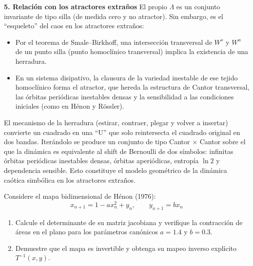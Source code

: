 \documentclass[11pt,a4paper]{article}
\newenvironment{solucion}[1][Solución Detallada]{%
    \vspace{1.5mm}%
    \noindent{\large\textbf{Solución:}}\par\vspace{1.5mm}%
}{%
    \par\vspace{3mm}%
}
\newenvironment{conclusion}[1][Interpretación Dinámica y Conclusión]{%
    \vspace{2mm}%
    \noindent{\large\textbf{Conclusión:}}\par\vspace{1.5mm}%
}{%
    \par\vspace{3mm}%
}
\begin{document}
\begin{solucion}
\textbf{\large 5. Relación con los atractores extraños}
El propio $\Lambda$ es un conjunto invariante de tipo silla (de medida cero y no atractor). Sin embargo, es el ``esqueleto'' del caos en los atractores extraños:
\begin{itemize}[leftmargin=2em]
    \item Por el teorema de Smale--Birkhoff, una intersección transversal de $W^s$ y $W^u$ de un punto silla (punto homoclínico transversal) implica la existencia de una herradura.
    \item En un sistema disipativo, la clausura de la variedad inestable de ese tejido homoclínico forma el atractor, que hereda la estructura de Cantor transversal, las órbitas periódicas inestables densas y la sensibilidad a las condiciones iniciales (como en Hénon y Rössler).
\end{itemize}

\end{solucion}

\begin{conclusion}
El mecanismo de la herradura (estirar, contraer, plegar y volver a insertar) convierte un cuadrado en una ``U'' que solo reintersecta el cuadrado original en dos bandas. Iterándolo se produce un conjunto de tipo Cantor $\times$ Cantor sobre el que la dinámica es equivalente al shift de Bernoulli de dos símbolos: infinitas órbitas periódicas inestables densas, órbitas aperiódicas, entropía $\ln 2$ y dependencia sensible. Esto constituye el modelo geométrico de la dinámica caótica simbólica en los atractores extraños.
\end{conclusion}

\vspace{3mm}

\begin{problema}[Problema 5.3]
Considere el mapa bidimensional de Hénon (1976):
\[
x_{n+1} = 1 - a x_n^2 + y_n, \qquad y_{n+1} = b x_n
\]
\begin{enumerate}[label=\textbf{\alph*)}]
    \item Calcule el determinante de su matriz jacobiana y verifique la contracción de áreas en el plano para los parámetros canónicos $a = 1.4$ y $b = 0.3$.
    \item Demuestre que el mapa es invertible y obtenga su mapeo inverso explícito $T^{-1}(x, y)$.
\end{enumerate}
\end{problema}
\end{document}
